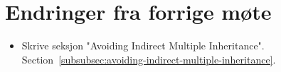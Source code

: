 
\chapter*{Endringer fra forrige møte}

\begin{itemize}
    \item Skrive seksjon "Avoiding Indirect Multiple Inheritance".
    Section~\vref{subsubsec:avoiding-indirect-multiple-inheritance}.
\end{itemize}


